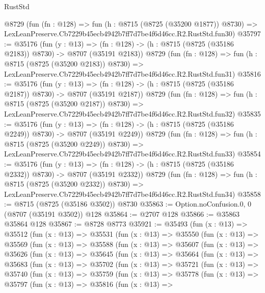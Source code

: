 \begin{lexlean}{RustStd}
\begin{coremodule}
    @8729
    (fun (fn : @128) =>
    fun (h : @8715 (@8725 (@35200 @1877)) @8730) =>
    LexLeanPreserve.Cb7229b45ecb4942b7ff7d7be4f6d46cc.R2.RustStd.fun30)
@35797 := @35176
    (fun (y : @13) =>
    (fn : @128) -> (h : @8715 (@8725 (@35186 @2183)) @8730) -> @8707 (@35191 @2183))
    @8729
    (fun (fn : @128) =>
    fun (h : @8715 (@8725 (@35200 @2183)) @8730) =>
    LexLeanPreserve.Cb7229b45ecb4942b7ff7d7be4f6d46cc.R2.RustStd.fun31)
@35816 := @35176
    (fun (y : @13) =>
    (fn : @128) -> (h : @8715 (@8725 (@35186 @2187)) @8730) -> @8707 (@35191 @2187))
    @8729
    (fun (fn : @128) =>
    fun (h : @8715 (@8725 (@35200 @2187)) @8730) =>
    LexLeanPreserve.Cb7229b45ecb4942b7ff7d7be4f6d46cc.R2.RustStd.fun32)
@35835 := @35176
    (fun (y : @13) =>
    (fn : @128) -> (h : @8715 (@8725 (@35186 @2249)) @8730) -> @8707 (@35191 @2249))
    @8729
    (fun (fn : @128) =>
    fun (h : @8715 (@8725 (@35200 @2249)) @8730) =>
    LexLeanPreserve.Cb7229b45ecb4942b7ff7d7be4f6d46cc.R2.RustStd.fun33)
@35854 := @35176
    (fun (y : @13) =>
    (fn : @128) -> (h : @8715 (@8725 (@35186 @2332)) @8730) -> @8707 (@35191 @2332))
    @8729
    (fun (fn : @128) =>
    fun (h : @8715 (@8725 (@35200 @2332)) @8730) =>
    LexLeanPreserve.Cb7229b45ecb4942b7ff7d7be4f6d46cc.R2.RustStd.fun34)
@35858 := @8715 (@8725 (@35186 @3502)) @8730
@35863 := Option.noConfusion.{0, 0} (@8707 (@35191 @3502)) @128
@35864 := @2707 @128
@35866 := @35863 @35864 @128
@35867 := @8728 @8773
@35921 := @35493
    (fun (x : @13) =>
    @35512
      (fun (x : @13) =>
      @35531
        (fun (x : @13) =>
        @35550
          (fun (x : @13) =>
          @35569
            (fun (x : @13) =>
            @35588
              (fun (x : @13) =>
              @35607
                (fun (x : @13) =>
                @35626
                  (fun (x : @13) =>
                  @35645
                    (fun (x : @13) =>
                    @35664
                      (fun (x : @13) =>
                      @35683
                        (fun (x : @13) =>
                        @35702
                          (fun (x : @13) =>
                          @35721
                            (fun (x : @13) =>
                            @35740
                              (fun (x : @13) =>
                              @35759
                                (fun (x : @13) =>
                                @35778
                                  (fun (x : @13) =>
                                  @35797
                                    (fun (x : @13) =>
                                    @35816
                                      (fun (x : @13) =>

\end{coremodule}
\end{lexlean}
